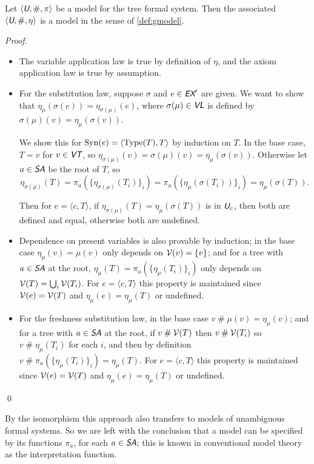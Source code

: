 \documentclass[runningheads,a4paper]{llncs}
\newcommand{\ex}{\textit{\textsf{EX}}} %
\newcommand{\vt}{\textit{\textsf{VT}}} %
\newcommand{\vl}{\textit{\textsf{VL}}} %
\newcommand{\uv}{\textit{\textsf{U}}} %
\newcommand{\sa}{\textit{\textsf{SA}}} %
\newcommand{\ang}[1]{\langle#1\rangle}
\newcommand{\type}{{\rm Type}}
\newcommand{\syn}{{\rm Syn}}
\newcommand{\fresh}{\mathbin{\#}}
\begin{document}
\begin{theorem}\label{thm:factor}
Let $\ang{\uv,\fresh,\pi}$ be a model for the tree formal system. Then the associated $\ang{\uv,\fresh,\eta}$ is a model in the sense of \autoref{def:gmodel}.
\end{theorem}
\begin{proof}\leavevmode
\begin{itemize}
  \item The variable application law is true by definition of $\eta$, and the axiom application law is true by assumption.
  \item For the substitution law, suppose $\sigma$ and $e\in\ex'$ are given. We want to show that $\eta_\mu(\sigma(e))=\eta_{\sigma(\mu)}(e)$, where $\sigma(\mu)\in\vl$ is defined by $\sigma(\mu)(v)=\eta_\mu(\sigma(v))$.

  We show this for $\syn(e)=\ang{\type(T),T}$ by induction on $T$. In the base case, $T=v$ for $v\in\vt$, so $\eta_{\sigma(\mu)}(v)=\sigma(\mu)(v)=\eta_\mu(\sigma(v))$. Otherwise let $a\in\sa$ be the root of $T$, so \[\eta_{\sigma(\mu)}(T)=\pi_a(\{\eta_{\sigma(\mu)}(T_i)\}_i) = \pi_a(\{\eta_\mu(\sigma(T_i))\}_i)=\eta_\mu(\sigma(T)).\]

  Then for $e=\ang{c,T}$, if $\eta_{\sigma(\mu)}(T)=\eta_\mu(\sigma(T))$ is in $\uv_c$, then both are defined and equal, otherwise both are undefined.

  \item Dependence on present variables is also provable by induction; in the base case $\eta_\mu(v)=\mu(v)$ only depends on ${\cal V}(v)=\{v\}$; and for a tree with $a\in\sa$ at the root, $\eta_\mu(T)=\pi_a(\{\eta_\mu(T_i)\}_i)$ only depends on ${\cal V}(T)=\bigcup_i{\cal V}(T_i)$. For $e=\ang{c,T}$ this property is maintained since ${\cal V}(e)={\cal V}(T)$ and $\eta_\mu(e)=\eta_\mu(T)$ or undefined.

  \item For the freshness substitution law, in the base case $v\fresh\mu(v)=\eta_\mu(v)$; and for a tree with $a\in\sa$ at the root, if $v\fresh{\cal V}(T)$ then $v\fresh{\cal V}(T_i)$ so $v\fresh\eta_\mu(T_i)$ for each $i$, and then by definition $v\fresh\pi_a(\{\eta_\mu(T_i)\}_i)=\eta_\mu(T)$. For $e=\ang{c,T}$ this property is maintained since ${\cal V}(e)={\cal V}(T)$ and $\eta_\mu(e)=\eta_\mu(T)$ or undefined.
\end{itemize}
\qed\end{proof}

By the isomorphism this approach also transfers to models of unambiguous formal systems. So we are left with the conclusion that a model can be specified by its functions $\pi_a$, for each $a\in\sa$; this is known in conventional model theory as the interpretation function.
\end{document}
